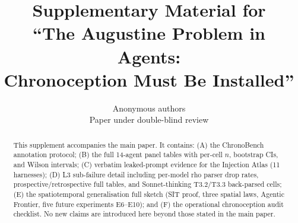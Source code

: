 \documentclass{article}
\title{Supplementary Material for\\``The Augustine Problem in Agents:\\Chronoception Must Be Installed''}
\author{Anonymous authors\\Paper under double-blind review}
\begin{document}
\maketitle

\begin{abstract}
This supplement accompanies the main paper. It contains: (A) the ChronoBench annotation protocol; (B) the full 14-agent panel tables with per-cell $n$, bootstrap CIs, and Wilson intervals; (C) verbatim leaked-prompt evidence for the Injection Atlas (11 harnesses); (D) L3 sub-failure detail including per-model rho parser drop rates, prospective/retrospective full tables, and Sonnet-thinking T3.2/T3.3 back-parsed cells; (E) the spatiotemporal generalisation full sketch (SIT proof, three spatial laws, Agentic Frontier, five future experiments E6--E10); and (F) the operational chronoception audit checklist. No new claims are introduced here beyond those stated in the main paper.
\end{abstract}

\tableofcontents










\end{document}
